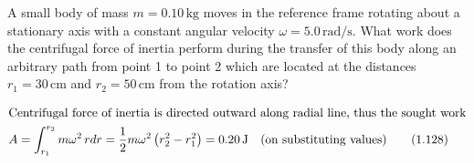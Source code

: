 \item A small body of mass \( m = 0.10 \, \text{kg} \) moves in the reference frame rotating about a stationary axis with a constant angular velocity \( \omega = 5.0 \, \text{rad/s} \). What work does the centrifugal force of inertia perform during the transfer of this body along an arbitrary path from point 1 to point 2 which are located at the distances \( r_1 = 30 \, \text{cm} \) and \( r_2 = 50 \, \text{cm} \) from the rotation axis?
\begin{solution}
    
    \begin{align*}
        \intertext{Centrifugal force of inertia is directed outward along radial line, thus the sought work}
        A &= \int_{r_1}^{r_2} m\omega^2 \, rdr = \frac{1}{2} m\omega^2 \left(r_2^2 - r_1^2\right)=0.20 \, \text{J} \quad (\text{on substituting values}) \tag{1.128}
    \end{align*}
\end{solution}
